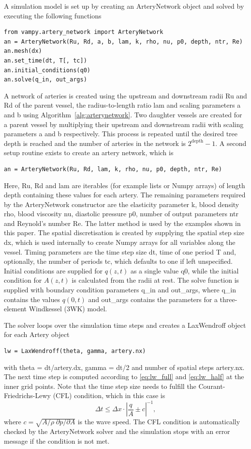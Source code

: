 \documentclass{jors}
\begin{document}
A simulation model is set up by creating an ArteryNetwork object and solved by executing the following functions
\begin{verbatim}
from vampy.artery_network import ArteryNetwork
an = ArteryNetwork(Ru, Rd, a, b, lam, k, rho, nu, p0, depth, ntr, Re)
an.mesh(dx)
an.set_time(dt, T[, tc])
an.initial_conditions(q0)
an.solve(q_in, out_args)
\end{verbatim}
A network of arteries is created using the upstream and downstream radii Ru and Rd of the parent vessel, the radius-to-length ratio lam and scaling parameters a and b using Algorithm~\ref{alg:arterynetwork}. Two daughter vessels are created for a parent vessel by multiplying their upstream and downstream radii with scaling parameters a and b respectively. This process is repeated until the desired tree depth is reached and the number of arteries in the network is $2^{\text{depth}}-1$. A second setup routine exists to create an artery network, which is
\begin{verbatim}
an = ArteryNetwork(Ru, Rd, lam, k, rho, nu, p0, depth, ntr, Re)
\end{verbatim}
Here, Ru, Rd and lam are iterables (for example lists or Numpy arrays) of length depth containing these values for each artery. The remaining parameters required by the ArteryNetwork constructor are the elasticity parameter k, blood density rho, blood viscosity nu, diastolic pressure p0, number of output parameters ntr and Reynold's number Re. The latter method is used by the examples shown in this paper. The spatial discretisation is created by supplying the spatial step size dx, which is used internally to create Numpy arrays for all variables along the vessel. Timing parameters are the time step size dt, time of one period T and, optionally, the number of periods tc, which defaults to one if left unspecified. Initial conditions are supplied for $q(z,t)$ as a single value q0, while the initial condition for $A(z,t)$ is calculated from the radii at rest. The solve function is supplied with boundary condition parameters q\_in and out\_args, where q\_in contains the values $q(0,t)$ and out\_args contains the parameters for a three-element Windkessel (3WK) model.

The solver loops over the simulation time steps and creates a LaxWendroff object for each Artery object
\begin{verbatim}
lw = LaxWendroff(theta, gamma, artery.nx)
\end{verbatim}
with theta = dt/artery.dx, gamma = dt/2 and number of spatial steps artery.nx. The next time step is computed according to \eqref{eq:lw_full} and \eqref{eq:lw_half} at the inner grid points. Note that the time step size needs to fulfill the Courant-Friedrichs-Lewy (CFL) condition, which in this case is
\begin{equation}
\Delta t \leq \Delta x \cdot \left| \frac{q}{A} \pm c \right|^{-1},
\end{equation}
where $c = \sqrt{A/\rho \; \partial p/\partial A}$ is the wave speed. The CFL condition is automatically checked by the ArteryNetwork solver and the simulation stops with an error message if the condition is not met.
\end{document}
